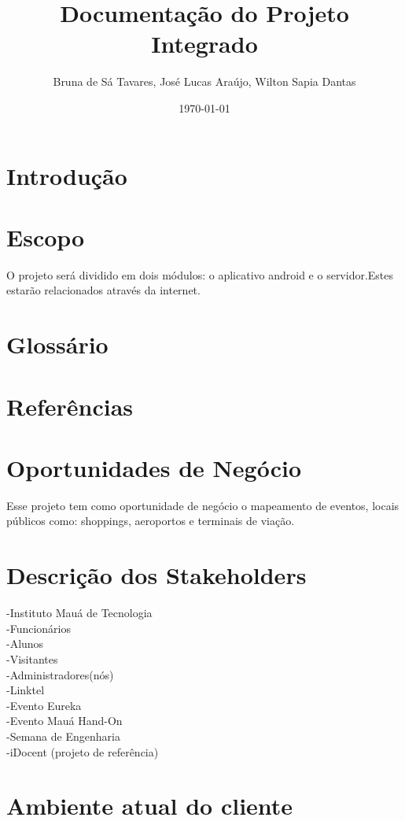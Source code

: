 \documentclass[13pt]{article}
\begin{document}
\title{Documentação do Projeto Integrado}
\author{Bruna de Sá Tavares, José Lucas Araújo, Wilton Sapia Dantas}
\date{\today}
\maketitle  



\section*{Introdução}

\section*{Escopo}
	O projeto será dividido em dois módulos: o aplicativo android e o servidor.Estes estarão relacionados através da internet.
\section*{Glossário}

\section*{Referências}

\section*{Oportunidades de Negócio}
	Esse projeto tem como oportunidade de negócio o mapeamento de eventos, locais públicos como: shoppings, aeroportos e terminais de viação.

\section*{Descrição dos Stakeholders}
	-Instituto Mauá de Tecnologia \\
	-Funcionários \\
	-Alunos \\
	-Visitantes \\
	-Administradores(nós)\\
	-Linktel \\
	-Evento Eureka \\
	-Evento Mauá Hand-On \\
	-Semana de Engenharia \\
	-iDocent (projeto de referência) \\ 
	
\section*{Ambiente atual do cliente}
\end{document}
